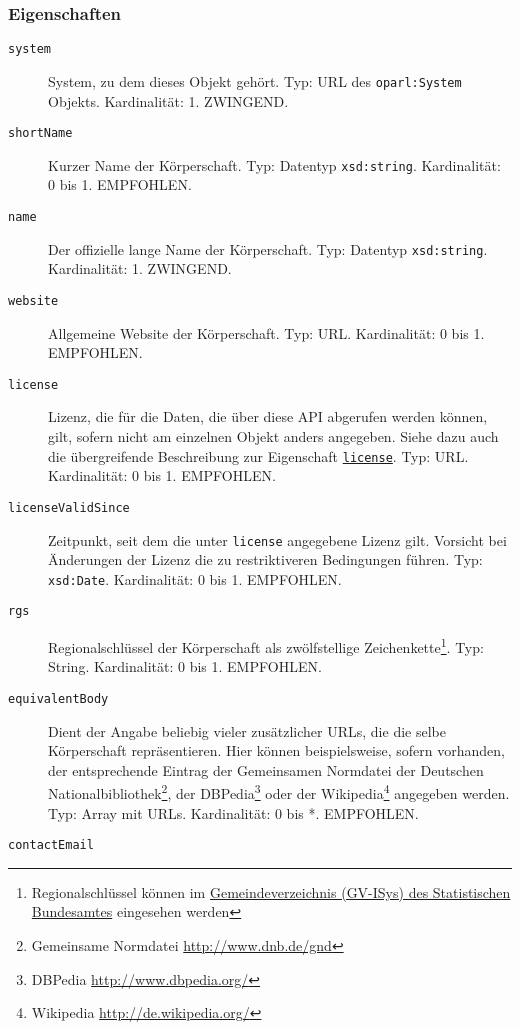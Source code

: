\documentclass[,a4paper]{article}
\begin{document}
\subsubsection{Eigenschaften}\label{eigenschaften-1}

\begin{description}
\item[\texttt{system}]
System, zu dem dieses Objekt gehört. Typ: URL des \texttt{oparl:System}
Objekts. Kardinalität: 1. ZWINGEND.
\item[\texttt{shortName}]
Kurzer Name der Körperschaft. Typ: Datentyp \texttt{xsd:string}.
Kardinalität: 0 bis 1. EMPFOHLEN.
\item[\texttt{name}]
Der offizielle lange Name der Körperschaft. Typ: Datentyp
\texttt{xsd:string}. Kardinalität: 1. ZWINGEND.
\item[\texttt{website}]
Allgemeine Website der Körperschaft. Typ: URL. Kardinalität: 0 bis 1.
EMPFOHLEN.
\item[\texttt{license}]
Lizenz, die für die Daten, die über diese API abgerufen werden können,
gilt, sofern nicht am einzelnen Objekt anders angegeben. Siehe dazu auch
die übergreifende Beschreibung zur Eigenschaft
\hyperref[eigenschaftux5flicense]{\texttt{license}}. Typ: URL.
Kardinalität: 0 bis 1. EMPFOHLEN.
\item[\texttt{licenseValidSince}]
Zeitpunkt, seit dem die unter \texttt{license} angegebene Lizenz gilt.
Vorsicht bei Änderungen der Lizenz die zu restriktiveren Bedingungen
führen. Typ: \texttt{xsd:Date}. Kardinalität: 0 bis 1. EMPFOHLEN.
\item[\texttt{rgs}]
Regionalschlüssel der Körperschaft als zwölfstellige
Zeichenkette\footnote{Regionalschlüssel können im
  \href{https://www.destatis.de/DE/ZahlenFakten/LaenderRegionen/Regionales/Gemeindeverzeichnis/Gemeindeverzeichnis.html}{Gemeindeverzeichnis
  (GV-ISys) des Statistischen Bundesamtes} eingesehen werden}. Typ:
String. Kardinalität: 0 bis 1. EMPFOHLEN.
\item[\texttt{equivalentBody}]
Dient der Angabe beliebig vieler zusätzlicher URLs, die die selbe
Körperschaft repräsentieren. Hier können beispielsweise, sofern
vorhanden, der entsprechende Eintrag der Gemeinsamen Normdatei der
Deutschen Nationalbibliothek\footnote{Gemeinsame Normdatei
  \url{http://www.dnb.de/gnd}}, der DBPedia\footnote{DBPedia
  \url{http://www.dbpedia.org/}} oder der Wikipedia\footnote{Wikipedia
  \url{http://de.wikipedia.org/}} angegeben werden. Typ: Array mit URLs.
Kardinalität: 0 bis *. EMPFOHLEN.
\item[\texttt{contactEmail}]

\end{description}
\end{document}
